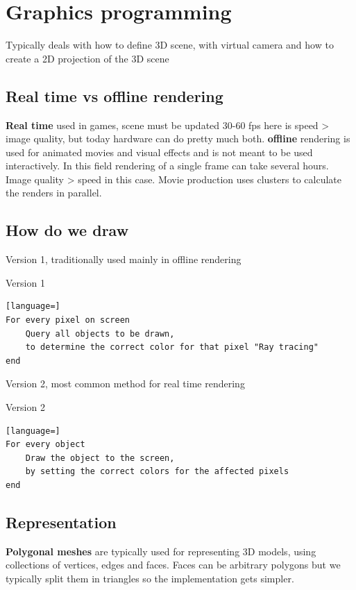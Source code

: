 

\section{Graphics programming}
Typically deals with how to define 3D scene, with virtual camera and how to create a 2D projection of the 3D scene

\subsection*{Real time vs offline rendering}
\textbf{Real time} used in games, scene must be updated 30-60 fps here is speed > image quality, but today hardware can do pretty much both. \textbf{offline} rendering is used for animated movies and visual effects and is not meant to be used interactively. In this field rendering of a single frame can take several hours. Image quality > speed in this case. Movie production uses clusters to calculate the renders in parallel.

\subsection*{How do we draw}
Version 1, traditionally used mainly in offline rendering

\begin{example}{Version 1}
\begin{lstlisting}[language=]
For every pixel on screen
	Query all objects to be drawn,
	to determine the correct color for that pixel "Ray tracing"
end
\end{lstlisting}
\end{example}

Version 2, most common method for real time rendering
\begin{example}{Version 2}
\begin{lstlisting}[language=]
For every object
	Draw the object to the screen,
	by setting the correct colors for the affected pixels
end
\end{lstlisting}
\end{example}


\subsection*{Representation}
\textbf{Polygonal meshes} are typically used for representing 3D models, using collections of vertices, edges and faces. Faces can be arbitrary polygons but we typically split them in triangles so the implementation gets simpler. 


